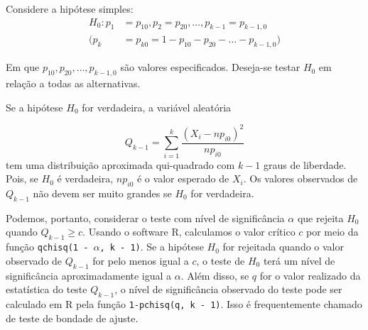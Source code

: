 \documentclass[12pt]{beamer}
\begin{document}
\begin{frame}{}
\begin{block}{}
\justifying
Considere a hipótese simples:
\begin{align*}
    H_0: p_1 &= p_{10}, p_2 = p_{20}, \ldots, p_{k-1} = p_{k-1,0}\\ 
    (p_k &= p_{k0} = 1 - p_{10} - p_{20} - \ldots - p_{k-1,0})
\end{align*}

Em que $p_{10}, p_{20}, \ldots, p_{k-1,0}$ são valores especificados. Deseja-se testar $H_0$ em relação a todas as alternativas.  
\end{block}
\pause
\begin{block}{}
\justifying
Se a hipótese $H_0$ for verdadeira, a variável aleatória

\[
Q_{k-1} = \sum_{i=1}^{k} \frac{(X_i - n p_{i0})^2}{n p_{i0}}
\]
tem uma distribuição aproximada qui-quadrado com $k - 1$ graus de liberdade. Pois, se $H_0$ é verdadeira, $n p_{i0}$ é o valor esperado de $X_i.$ Os valores observados de $Q_{k-1}$ não devem ser muito grandes se $H_0$ for verdadeira.
\end{block}
\end{frame}

\begin{frame}{}
\begin{block}{}
\justifying
Podemos, portanto, considerar o teste com nível de significância $\alpha$ que rejeita $H_0$ quando $Q_{k-1} \geq c.$ Usando o software R, calculamos o valor crítico $c$ por meio da função \texttt{qchisq(1 - $\alpha$, k - 1)}. Se a hipótese $H_0$ for rejeitada quando o valor observado de $Q_{k-1}$ for pelo menos igual a $c$, o teste de $H_0$ terá um nível de significância aproximadamente igual a $\alpha$. Além disso, se $q$ for o valor realizado da estatística do teste $Q_{k-1}$, o nível de significância observado do teste pode ser calculado em R pela função \texttt{1-pchisq(q, k - 1)}. Isso é frequentemente chamado de teste de bondade de ajuste. 

\end{block}
\end{frame}
\end{document}
